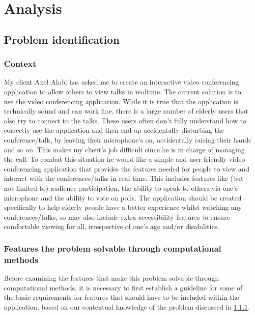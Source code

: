 \pagestyle{fancy}
\chead{\thepage}

\chapter{Analysis}

\section{Problem identification}

\subsection{Context}
\label{sec:1.1.1}

My client Axel Alabi has asked me to create an interactive
video conferencing application to allow others to view talks 
in realtime. The current solution is to use the  
video conferencing application. While it is true that the 
application is technically sound and can work fine, there is a
large number of elderly users that also try to connect to the 
talks. These users often don't fully understand how to 
correctly use the application and then end up accidentally 
disturbing the conference/talk, by leaving their microphone's
on, accidentally raising their hands and so on. This makes my
client's job difficult since he is in charge of managing the 
 call. To combat this situation he would like a 
simple and user friendly video conferencing application that
provides the features needed for people to view and interact
with the conferences/talks in real time. This includes 
features like (but not limited to) audience participation,
the ability to speak to others via one's microphone and the
ability to vote on polls. The application should be
created specifically to help elderly people have a better 
experience whilst watching any conferences/talks, so may also
include extra accessibility features to ensure comfortable
viewing for all, irrespective of one's age and/or disabilities.

\subsection{Features the problem solvable through
computational methods}

Before examining the features that make this problem solvable
through computational methods, it is necessary to first 
establish a guideline for some of the basic requirements
for features that should have to be included within the 
application, based on our contextual knowledge of the problem
discussed in 
\ref{sec:1.1.1}. \vspace{0.2cm}

